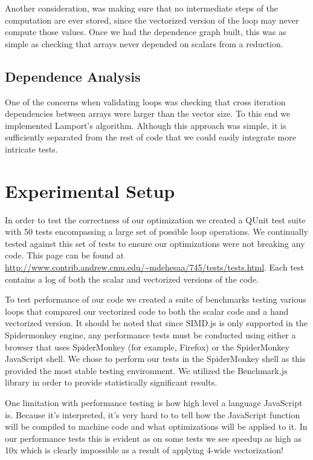 \documentclass[conference]{IEEEtran}
\begin{document}
Another consideration, was making sure that no intermediate steps of the
computation are ever stored, since the vectorized version of the loop may never
compute those values. Once we had the dependence graph built, this was as
simple as checking that arrays never depended on scalars from a reduction.

\subsection{Dependence Analysis}

One of the concerns when validating loops was checking that cross iteration
dependencies between arrays were larger than the vector size. To this end we
implemented Lamport's algorithm. Although this approach was simple, it is
sufficiently separated from the rest of code that we could easily integrate more
intricate tests.

\section{Experimental Setup}

In order to test the correctness of our optimization we created a
QUnit\cite{qunit} test suite with 50 tests encompassing a large set of possible
loop operations. We continually tested against this set of tests to ensure our
optimizations were not breaking any code. This page can be found at
\url{http://www.contrib.andrew.cmu.edu/~mdehesaa/745/tests/tests.html}. Each
test contains a log of both the scalar and vectorized versions of the code.

To test performance of our code we created a suite of benchmarks testing
various loops that compared our vectorized code to both the scalar code and a
hand vectorized version. It should be noted that since SIMD.js is only
supported in the Spidermonkey engine, any performance tests must be conducted
using either a browser that uses SpiderMonkey (for example, Firefox) or the
SpiderMonkey JavaScript shell.  We chose to perform our tests in the
SpiderMonkey shell as this provided the most stable testing environment. We
utilized the Benchmark.js library in order to provide statistically significant
results.

One limitation with performance testing is how high level a language JavaScript
is. Because it's interpreted, it's very hard to to tell how the JavaScript function will be
compiled to machine code and what optimizations will be applied to it. In our
performance tests this is evident as on some tests we see speedup as high as 10x
which is clearly impossible as a result of applying 4-wide vectorization!
\end{document}
